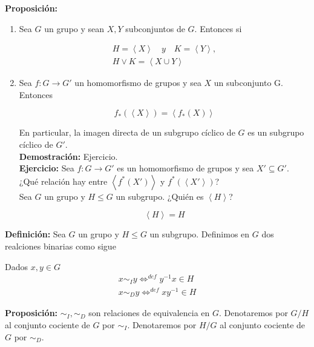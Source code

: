\documentclass{article}
\begin{document}
\textbf{Proposición:}
\begin{enumerate}[1)] 
\item Sea $G$ un grupo y sean $X,Y$ subconjuntos de $G$. Entonces si

\begin{gather*}
H=\left\langle X \right\rangle \quad y \quad K=\left\langle Y \right\rangle, \\
H\lor K=\left\langle X \cup Y \right\rangle
\end{gather*}

\item Sea $f:G \rightarrow G'$ un homomorfismo de grupos y sea $X$ un subconjunto G. Entonces

\begin{equation*}
f_{*}(\left\langle X \right\rangle)=\left\langle f_{*}(X) \right\rangle
\end{equation*}

En particular, la imagen directa de un subgrupo cíclico de $G$ es un subgrupo cíclico de $G'$. \\

\textbf{Demostración:} Ejercicio. \\

\textbf{Ejercicio:} Sea $f:G\rightarrow G'$ es un homomorfismo de grupos y sea $X'\subseteq G'$. ¿Qué relación hay entre $\left\langle f^*(X')\right\rangle$ y $f^*(\left\langle X' \right\rangle)$? \\

Sea $G$ un grupo y $H \leq G$ un subgrupo. ¿Quién es $\left\langle H \right\rangle$?

\begin{equation*}
\left\langle H \right\rangle = H
\end{equation*}
\end{enumerate}

\textbf{Definición:} Sea $G$ un grupo y $H \leq G$ un subgrupo. Definimos en $G$ dos realciones binarias como sigue


Dados $x,y \in G$
\begin{gather*}
x\sim_I y \Leftrightarrow^{def} y^{-1}x\in H \\
x\sim_D y \Leftrightarrow^{def} xy^{-1} \in H
\end{gather*}

\textbf{Proposición:} $\sim_I,\sim_D$ son relaciones de equivalencia en $G$. Denotaremos por $G/H$ al conjunto cociente de $G$ por $\sim_I$. Denotaremos por $H/G$ al conjunto cociente de $G$ por $\sim_D$.
\end{document}
